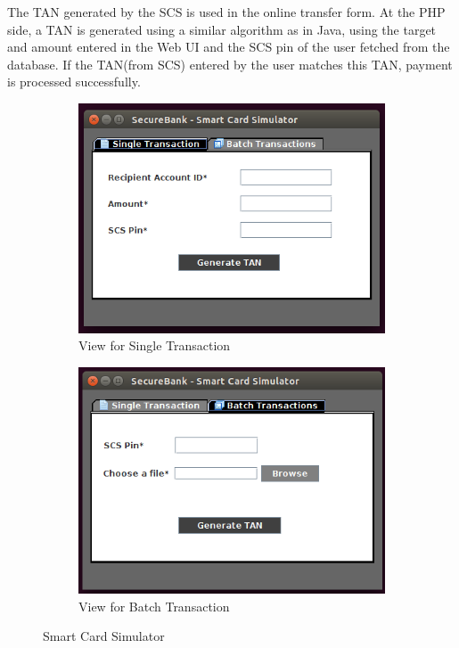 The TAN generated by the SCS is used in the online transfer form. 
At the PHP side, a TAN is generated using a similar algorithm as in Java, using
the target and amount entered in the Web UI and the SCS pin of the user fetched
from the database. If the TAN(from SCS) entered by the user matches this TAN,
payment is processed successfully. \\

\begin{figure}[ht]
	\centering
	\begin{subfigure}{.45\textwidth}
		\centering
		\includegraphics[width=.9\linewidth]{figures/scs_mode_single.png}
		\caption{View for Single Transaction}
	\end{subfigure}\hfill%
	\begin{subfigure}{.45\textwidth}
		\centering
		\includegraphics[width=.9\linewidth]{figures/scs_mode_batch.png}
		\caption{View for Batch Transaction}
	\end{subfigure}
	\caption{Smart Card Simulator}
	\label{fig:scs_modes}
\end{figure}


